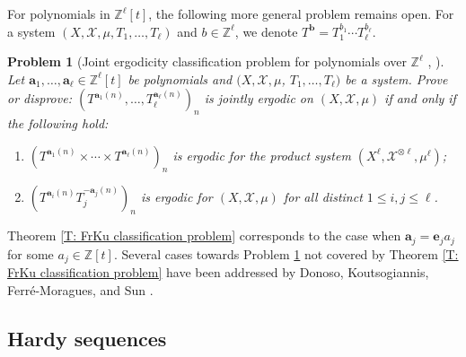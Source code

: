 \documentclass[11pt]{amsart}
\newtheorem{problem}{Problem}
\theoremstyle{definition}
\newcommand{\Z}{{\mathbb Z}}
\newcommand{\CX}{{\mathcal X}}
\newcommand{\ba}{\mathbf{a}}
\renewcommand{\b}{{\mathbf{b}}}
\newcommand{\be}{{\mathbf{e}}}
\newcommand{\1}{{\mathbf{1}}}
\begin{document}
For polynomials in $\Z^\ell[t]$, the following more general problem remains open. For a system $(X, \CX, \mu, T_1, \ldots,T_\ell)$ and $b\in\Z^\ell$, we denote $T^\b = T_1^{b_1}\cdots T_\ell^{b_\ell}$.
\begin{problem}[Joint ergodicity classification problem for polynomials over $\Z^\ell$ {\cite[Conjecture 1.5]{DKS22}, \cite[Conjecture 1.3]{DFKS22}}]\label{Pr: general classification problem for polys}
    Let $\ba_1, \ldots, \ba_\ell\in\Z^\ell[t]$ be polynomials and $(X, \CX, \mu$, $T_1, \ldots, T_\ell)$ be a system. Prove or disprove: $(T^{\ba_1(n)}, \ldots, T_\ell^{\ba_\ell(n)})_n$ is jointly ergodic on $(X, \CX, \mu)$ if and only if the following hold:
    \begin{enumerate}
    \item $(T^{{\ba_1(n)}}\times \cdots \times T^{{\ba_\ell(n)}})_n$ is ergodic for the product system $(X^\ell, \CX^{\otimes \ell}, \mu^\ell)$;
    \item $(T^{{\ba_i(n)}}T_j^{-\ba_j(n)})_n$ is ergodic for $(X, \CX, \mu)$ for all distinct $1\leq i, j\leq \ell$.
    \end{enumerate}
\end{problem}
Theorem \ref{T: FrKu classification problem} corresponds to the case when $\ba_j = \be_j a_j$ for some $a_j\in\Z[t]$. Several cases towards Problem \ref{Pr: general classification problem for polys} not covered by Theorem \ref{T: FrKu classification problem} have been addressed by Donoso, Koutsogiannis, Ferr\'e-Moragues, and Sun \cite{DFKS22}.

\subsection{Hardy sequences}
\end{document}
